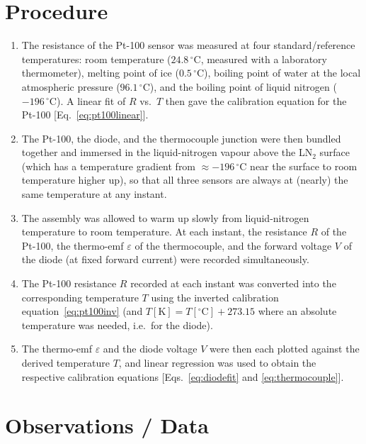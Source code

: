 \documentclass[11pt,a4paper]{article}
\begin{document}
\section{Procedure}
\begin{enumerate}
    \item The resistance of the Pt-100 sensor was measured at four standard/reference temperatures: room temperature ($24.8\,^{\circ}\mathrm{C}$, measured with a laboratory thermometer), melting point of ice ($0.5\,^{\circ}\mathrm{C}$), boiling point of water at the local atmospheric pressure ($96.1\,^{\circ}\mathrm{C}$), and the boiling point of liquid nitrogen ($-196\,^{\circ}\mathrm{C}$). A linear fit of $R$ vs.\ $T$ then gave the calibration equation for the Pt-100 [Eq.~\eqref{eq:pt100linear}].
    \item The Pt-100, the diode, and the thermocouple junction were then bundled together and immersed in the liquid-nitrogen vapour above the LN$_2$ surface (which has a temperature gradient from $\approx -196\,^{\circ}\mathrm{C}$ near the surface to room temperature higher up), so that all three sensors are always at (nearly) the same temperature at any instant.
    \item The assembly was allowed to warm up slowly from liquid-nitrogen temperature to room temperature. At each instant, the resistance $R$ of the Pt-100, the thermo-emf $\varepsilon$ of the thermocouple, and the forward voltage $V$ of the diode (at fixed forward current) were recorded simultaneously.
    \item The Pt-100 resistance $R$ recorded at each instant was converted into the corresponding temperature $T$ using the inverted calibration equation~\eqref{eq:pt100inv} (and $T[\mathrm{K}] = T[^\circ\mathrm{C}] + 273.15$ where an absolute temperature was needed, i.e.\ for the diode).
    \item The thermo-emf $\varepsilon$ and the diode voltage $V$ were then each plotted against the derived temperature $T$, and linear regression was used to obtain the respective calibration equations [Eqs.~\eqref{eq:diodefit} and \eqref{eq:thermocouple}].
\end{enumerate}

\section{Observations / Data}
\end{document}
